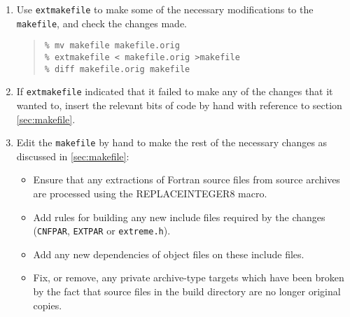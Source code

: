 \documentclass[twoside,11pt]{article}
\newcommand{\htmlref}[2]{#1}
\newcommand{\html}[1]{}
\renewcommand{\_}{\texttt{\symbol{95}}}
\newcommand{\xroutine}[1]{\htmlref{{\tt #1}}{#1}}
\newcommand{\file}[1]{{\tt #1}}
\newcommand{\routine}[1]{{\tt #1}}
\newenvironment{squote}{\begin{quote}\begin{small}}{\end{small}\end{quote}}
\begin{document}
\begin{enumerate}
If there are platform-dependent files in the package you must either add
\begin{squote}
\begin{verbatim}
      SOURCE_VARIANT='alpha_OSF1'
\end{verbatim}
\end{squote}
and
\begin{squote}
\begin{verbatim}
      SOURCE_VARIANT='sun4_Solaris'
\end{verbatim}
\end{squote}
to the new alpha\_OSF1\_64 and sun4\_Solaris\_64 stanzas of the \file{mk} file
respectively, or generate new platform-dependent files for the 
two new platforms.
\html{\begin{squote}\end{squote}}
%
\item
Use \xroutine{extmakefile} to make some of the necessary modifications 
to the \file{makefile}, and check the changes made.
\begin{squote}
\begin{verbatim}
% mv makefile makefile.orig
% extmakefile < makefile.orig >makefile
% diff makefile.orig makefile
\end{verbatim}
\end{squote}
%
\item
If \routine{extmakefile} indicated that it failed to make any of the
changes that it wanted to, insert the relevant bits of code by hand
with reference to section \ref{sec:makefile}.
\html{\begin{squote}\end{squote}}
%
\item
Edit the \file{makefile} by hand to make the rest of the necessary changes
as discussed in \ref{sec:makefile}:
\begin{itemize}
\item
Ensure that any extractions of Fortran source files from source archives
are processed using the REPLACE\_INTEGER8 macro.
\item
Add rules for building any new include files required by the changes
(\file{CNF\_PAR}, \file{EXT\_PAR} or \file{extreme.h}).
\item
Add any new dependencies of object files on these include files.
\item
Fix, or remove, any private archive-type targets which have been broken
by the fact that source files in the build directory are no longer
original copies.
\end{itemize}

\end{enumerate}
\end{document}
